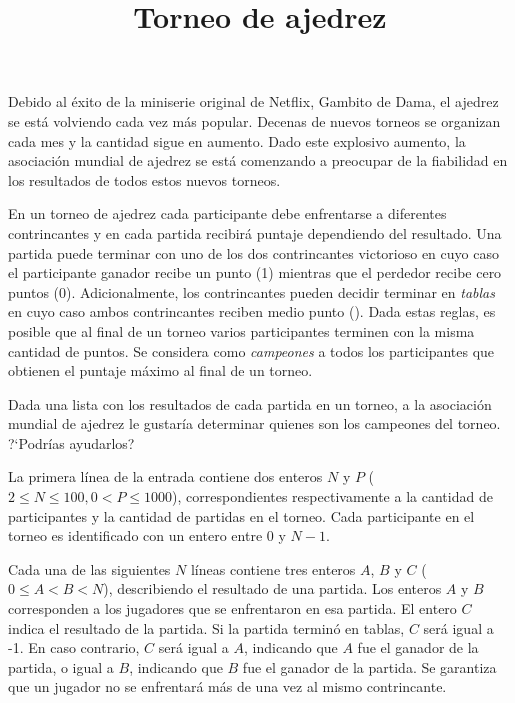 \documentclass{oci}
\title{Torneo de ajedrez}
\begin{document}
\begin{problemDescription}
  Debido al éxito de la miniserie original de Netflix, Gambito de Dama, el ajedrez
  se está volviendo cada vez más popular.
  Decenas de nuevos torneos se organizan cada mes y la cantidad sigue en aumento.
  Dado este explosivo aumento, la asociación mundial de ajedrez se está comenzando a preocupar
  de la fiabilidad en los resultados de todos estos nuevos torneos.

  En un torneo de ajedrez cada participante debe enfrentarse a diferentes contrincantes y en cada
  partida recibirá puntaje dependiendo del resultado.
  Una partida puede terminar con uno de los dos contrincantes victorioso en cuyo caso el
  participante ganador recibe un punto (1) mientras que el perdedor recibe cero puntos (0).
  Adicionalmente, los contrincantes pueden decidir terminar en \emph{tablas} en cuyo caso ambos
  contrincantes reciben medio punto ().
  Dada estas reglas, es posible que al final de un torneo varios participantes terminen con
  la misma cantidad de puntos.
  Se considera como \emph{campeones} a todos los participantes que obtienen el puntaje máximo
  al final de un torneo.

  Dada una lista con los resultados de cada partida en un torneo, a la asociación
  mundial de ajedrez le gustaría determinar quienes son los campeones del torneo.
  ?`Podrías ayudarlos?
\end{problemDescription}

\begin{inputDescription}
  La primera línea de la entrada contiene dos enteros $N$ y $P$
  ($2 \leq N \leq 100, 0 < P \leq 1000$),
  correspondientes respectivamente a la cantidad de participantes y la cantidad de partidas
  en el torneo.
  Cada participante en el torneo es identificado con un entero entre 0 y $N-1$.

  Cada una de las siguientes $N$ líneas contiene tres enteros $A$, $B$ y $C$
  ($0\leq A < B < N$), describiendo el resultado de una partida.
  Los enteros $A$ y $B$ corresponden a los jugadores que se enfrentaron en esa partida.
  El entero $C$ indica el resultado de la partida.
  Si la partida terminó en tablas, $C$ será igual a {-1}.
  En caso contrario, $C$ será igual a $A$, indicando que $A$ fue el ganador de la partida, o igual
  a $B$, indicando que $B$ fue el ganador de la partida.
  Se garantiza que un jugador no se enfrentará más de una vez al mismo contrincante.
\end{inputDescription}
\end{document}
